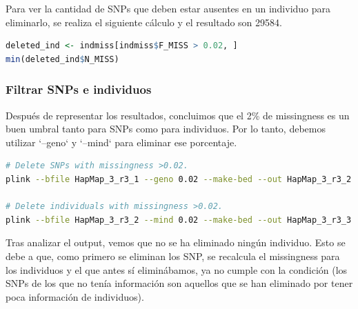 Para ver la cantidad de SNPs que deben estar ausentes en un individuo para eliminarlo, se realiza el siguiente cálculo y el resultado son 29584.
\begin{lstlisting}[language=R]
deleted_ind <- indmiss[indmiss$F_MISS > 0.02, ]
min(deleted_ind$N_MISS)
\end{lstlisting}

\subsubsection{Filtrar SNPs e individuos}
Después de representar los resultados, concluimos que el 2\% de missingness es un buen umbral tanto para SNPs como para individuos. Por lo tanto, debemos utilizar `--geno` y `--mind` para eliminar ese porcentaje.

\begin{lstlisting}[language=bash]
# Delete SNPs with missingness >0.02.
plink --bfile HapMap_3_r3_1 --geno 0.02 --make-bed --out HapMap_3_r3_2

# Delete individuals with missingness >0.02.
plink --bfile HapMap_3_r3_2 --mind 0.02 --make-bed --out HapMap_3_r3_3
\end{lstlisting}

Tras analizar el output, vemos que no se ha eliminado ningún individuo. Esto se debe a que, como primero se eliminan los SNP, se recalcula el missingness para los individuos y el que antes sí eliminábamos, ya no cumple con la condición (los SNPs de los que no tenía información son aquellos que se han eliminado por tener poca información de individuos).